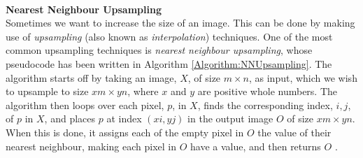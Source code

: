 \documentclass[./main.tex]{subfiles}
\begin{document}
\\
\noindent \textbf{Nearest Neighbour Upsampling} \\
Sometimes we want to increase the size of an image. This can be done by making use of \textit{upsampling} (also known as \textit{interpolation}) techniques. One of the most common upsampling techniques is \textit{nearest neighbour upsampling}, whose pseudocode has been written in Algorithm \ref{Algorithm:NNUpsampling}. The algorithm starts off by taking an image, $X$, of size $m \times n$, as input, which we wish to upsample to size $xm \times yn$, where $x$ and $y$ are positive whole numbers. The algorithm then loops over each pixel, $p$, in $X$, finds the corresponding index, $i, j$, of $p$ in $X$, and places $p$ at index $(xi, yj)$ in the output image $O$ of size $xm \times yn$. When this is done, it assigns each of the empty pixel in $O$ the value of their nearest neighbour, making each pixel in $O$ have a value, and then returns $O$ \cite{NNUpsampling}.
\end{document}

